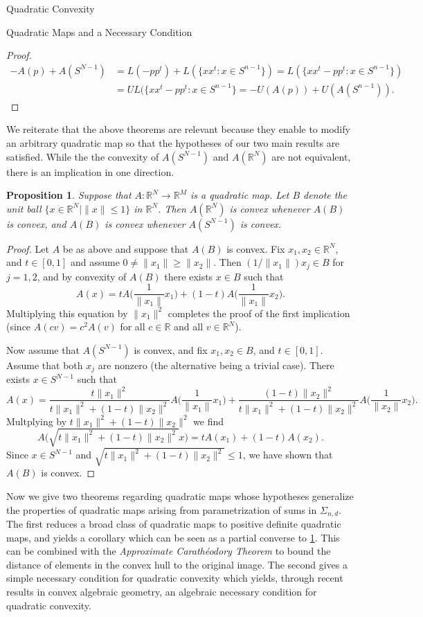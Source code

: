 \documentclass[12pt,oneside,final]{ucthesisucsbmath2010}
\newcommand{\R}{\mathbb{R}}
\newcommand{\snd}{\Sigma_{n,d}}
\newtheorem{prop}[thm]{Proposition}
\theoremstyle{definition}
\begin{document}
\begin{chapter}{Quadratic Convexity}
\begin{section}{Quadratic Maps and a Necessary Condition}
\begin{proof}
\begin{align*}
-A(p)+A(S^{N-1}) &=L(-pp^t)+L(\{xx^t: x \in S^{n-1}\})=L(\{xx^t-pp^t: x \in S^{n-1}\})\\
&= UL(\{xx^t-pp^t: x \in S^{n-1}\} =-U(A(p))+U(A(S^{n-1})).
\end{align*}

\end{proof}

We reiterate that the above theorems are relevant because they enable to modify an arbitrary quadratic map so that the hypotheses of our two main results are satisfied. While the the convexity of $A(S^{N-1})$ and $A(\R^N)$ are not equivalent, there is an implication in one direction.

\begin{prop}Suppose that $A : \R^N \to \R^M$ is a quadratic map. Let $B$ denote the unit ball $\{x \in \R^N \mid \|x\| \leq1\}$ in $\R^N$. Then $A(\R^N)$ is convex whenever $A(B)$ is convex, and $A(B)$ is convex whenever $A(S^{N-1})$ is convex.
\label{WaferBallCone}
\end{prop}

\begin{proof}Let $A$ be as above and suppose that $A(B)$ is convex. Fix $x_1,x_2 \in \R^N$, and $t \in [0,1]$ and assume $0\neq \|x_1\| \geq \|x_2\|$. Then $(1\slash \|x_1\|)x_j \in B$ for $j=1,2$, and by convexity of $A(B)$ there exists $x \in B$ such that \[A(x) = tA\Big(\frac{1}{\|x_1\|}x_1 \Big)+(1-t)A\Big(\frac{1}{\|x_1\|}x_2 \Big).\] Multiplying this equation by $\|x_1\|^2$ completes the proof of the first implication (since $A(cv)=c^2A(v)$ for all $c \in \R$ and all $v \in \R^N$).

Now assume that $A(S^{N-1})$ is convex, and fix $x_1,x_2 \in B$, and $t \in [0,1]$. Assume that both $x_j$ are nonzero (the alternative being a trivial case). There exists $x \in S^{N-1}$ such that \[A(x) = \frac{t\|x_1\|^2}{t\|x_1\|^2+(1-t)\|x_2\|^2}A\Big(\frac{1}{\|x_1\|}x_1\Big)+\frac{(1-t)\|x_2\|^2}{t\|x_1\|^2+(1-t)\|x_2\|^2}A\Big(\frac{1}{\|x_2\|}x_2\Big).\] Multplying by $t\|x_1\|^2+(1-t)\|x_2\|^2$ we find \[A\Big(\sqrt{t\|x_1\|^2+(1-t)\|x_2\|^2}x\Big) = tA(x_1)+(1-t)A(x_2).\] Since $x \in S^{N-1}$ and $\sqrt{t\|x_1\|^2+(1-t)\|x_2\|^2} \leq 1$, we have shown that $A(B)$ is convex.
\end{proof}

Now we give two theorems regarding quadratic maps whose hypotheses generalize the properties of quadratic maps arising from parametrization of sums in $\snd$. The first reduces a broad class of quadratic maps to positive definite quadratic maps, and yields a corollary which can be seen as a partial converse to \ref{WaferBallCone}. This can be combined with the  \emph{Approximate Carath\'{e}odory Theorem} to bound the distance of elements in the convex hull to the original image. The second gives a simple necessary condition for quadratic convexity which yields, through recent results in convex algebraic geometry, an algebraic necessary condition for quadratic convexity.


\end{section}
\end{chapter}
\end{document}

